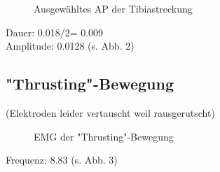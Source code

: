 \begin{figure}[H]
\caption{Ausgewähltes AP der Tibiastreckung}
\label{kick-ap}
\end{figure}

Dauer: 0.018/2= 0.009\\
Amplitude: 0.0128 (s. Abb. 2)

\subsection{"{}Thrusting"{}-Bewegung}
(Elektroden leider vertauscht weil rausgerutscht)
\begin{figure}[H]
\caption{EMG der "{}Thrusting"{}-Bewegung}
\label{thrust}
\end{figure}
Frequenz: 8.83 (s. Abb. 3)

